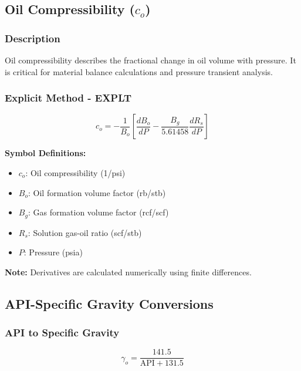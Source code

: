\documentclass[11pt,a4paper]{article}
\newcommand{\symitem}[2]{\item \textbf{#1}: #2}
\begin{document}
\subsection{Oil Compressibility ($c_o$)}

\subsubsection{Description}
Oil compressibility describes the fractional change in oil volume with pressure. It is critical for material balance calculations and pressure transient analysis.

\subsubsection{Explicit Method - EXPLT}

\begin{tcolorbox}[colback=formulabox,colframe=black!75]
\begin{equation}
c_o = -\frac{1}{B_o} \left[ \frac{dB_o}{dP} - \frac{B_g}{5.61458} \frac{dR_s}{dP} \right]
\end{equation}
\end{tcolorbox}

\textbf{Symbol Definitions:}
\begin{itemize}[leftmargin=2cm]
\symitem{$c_o$}{Oil compressibility (1/psi)}
\symitem{$B_o$}{Oil formation volume factor (rb/stb)}
\symitem{$B_g$}{Gas formation volume factor (rcf/scf)}
\symitem{$R_s$}{Solution gas-oil ratio (scf/stb)}
\symitem{$P$}{Pressure (psia)}
\end{itemize}

\textbf{Note:} Derivatives are calculated numerically using finite differences.

\subsection{API-Specific Gravity Conversions}

\subsubsection{API to Specific Gravity}

\begin{tcolorbox}[colback=formulabox,colframe=black!75]
\begin{equation}
\gamma_o = \frac{141.5}{\text{API} + 131.5}
\end{equation}
\end{tcolorbox}
\end{document}
